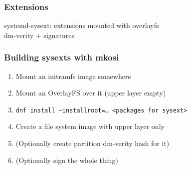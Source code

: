 \documentclass[]{beamer}
\begin{document}







\begin{frame}
  \frametitle{Extensions}

  systemd-sysext: extensions mounted with overlayfs\\

  \phantom{systemd-sysext: }dm-verity + signatures
\end{frame}

\begin{frame}
  \frametitle{Building sysexts with mkosi}

  \begin{enumerate}
  \item Mount an initramfs image somewhere
  \item Mount an OverlayFS over it (upper layer empty)
  \item \texttt{dnf install --installroot=… <packages for sysext>}
  \item Create a file system image with upper layer only
  \item (Optionally create partition dm-verity hash for it)
  \item (Optionally sign the whole thing)
  \end{enumerate}
\end{frame}


\end{document}
